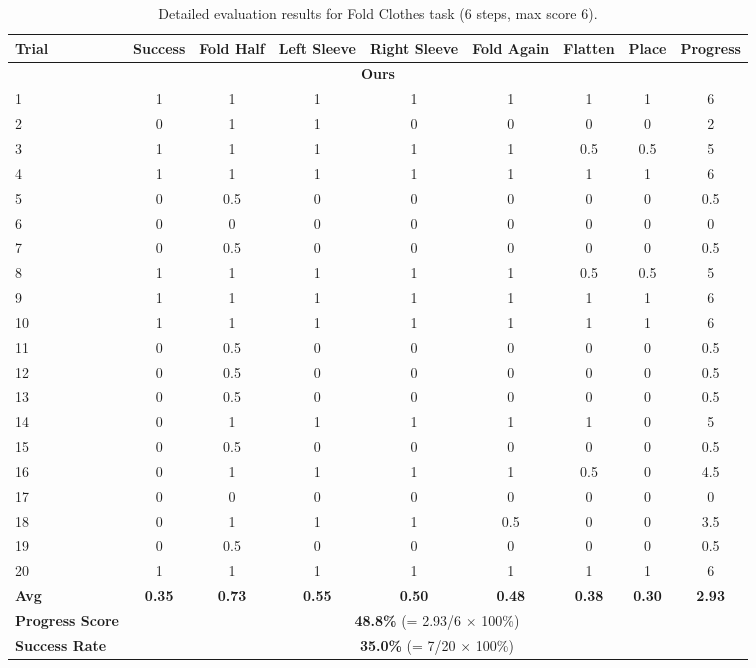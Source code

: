 \documentclass[onecolumn]{robbyant}           %
\begin{document}
\begin{table}[t]
\centering
\caption{Detailed evaluation results for Fold Clothes task (6 steps, max score 6).}
\label{tab:realworld_detailed_fold_clothes}
\scriptsize
\begin{tabular}{l|c|cccccc|c}
\toprule
\textbf{Trial} & \textbf{Success} & \textbf{Fold Half} & \textbf{Left Sleeve} & \textbf{Right Sleeve} & \textbf{Fold Again} & \textbf{Flatten} & \textbf{Place} & \textbf{Progress} \\
\midrule
\multicolumn{9}{c}{\textbf{Ours}} \\
\midrule
1  & 1 & 1 & 1 & 1 & 1 & 1 & 1 & 6 \\
2  & 0 & 1 & 1 & 0 & 0 & 0 & 0 & 2 \\
3  & 1 & 1 & 1 & 1 & 1 & 0.5 & 0.5 & 5 \\
4  & 1 & 1 & 1 & 1 & 1 & 1 & 1 & 6 \\
5  & 0 & 0.5 & 0 & 0 & 0 & 0 & 0 & 0.5 \\
6  & 0 & 0 & 0 & 0 & 0 & 0 & 0 & 0 \\
7  & 0 & 0.5 & 0 & 0 & 0 & 0 & 0 & 0.5 \\
8  & 1 & 1 & 1 & 1 & 1 & 0.5 & 0.5 & 5 \\
9  & 1 & 1 & 1 & 1 & 1 & 1 & 1 & 6 \\
10 & 1 & 1 & 1 & 1 & 1 & 1 & 1 & 6 \\
11 & 0 & 0.5 & 0 & 0 & 0 & 0 & 0 & 0.5 \\
12 & 0 & 0.5 & 0 & 0 & 0 & 0 & 0 & 0.5 \\
13 & 0 & 0.5 & 0 & 0 & 0 & 0 & 0 & 0.5 \\
14 & 0 & 1 & 1 & 1 & 1 & 1 & 0 & 5 \\
15 & 0 & 0.5 & 0 & 0 & 0 & 0 & 0 & 0.5 \\
16 & 0 & 1 & 1 & 1 & 1 & 0.5 & 0 & 4.5 \\
17 & 0 & 0 & 0 & 0 & 0 & 0 & 0 & 0 \\
18 & 0 & 1 & 1 & 1 & 0.5 & 0 & 0 & 3.5 \\
19 & 0 & 0.5 & 0 & 0 & 0 & 0 & 0 & 0.5 \\
20 & 1 & 1 & 1 & 1 & 1 & 1 & 1 & 6 \\
\midrule
\textbf{Avg} & \textbf{0.35} & \textbf{0.73} & \textbf{0.55} & \textbf{0.50} & \textbf{0.48} & \textbf{0.38} & \textbf{0.30} & \textbf{2.93} \\
\textbf{Progress Score} & \multicolumn{8}{c}{\textbf{48.8\%} (= 2.93/6 $\times$ 100\%)} \\
\textbf{Success Rate} & \multicolumn{8}{c}{\textbf{35.0\%} (= 7/20 $\times$ 100\%)} \\

\end{tabular}
\end{table}
\end{document}
